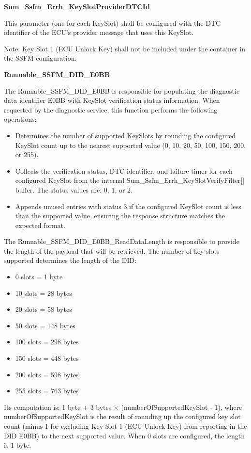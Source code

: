 \textbf{Sum\_Ssfm\_Errh\_KeySlotProviderDTCId}

This parameter (one for each KeySlot) shall be configured with the DTC identifier of the ECU's provider message that uses this KeySlot.

Note: Key Slot 1 (ECU Unlock Key) shall not be included under the  container in the SSFM configuration.

\textbf{Runnable\_SSFM\_DID\_E0BB}

The Runnable\_SSFM\_DID\_E0BB is responsible for populating the diagnostic data identifier E0BB with KeySlot verification status information. When requested by the diagnostic service, this function performs the following operations:

\begin{itemize}
	\item Determines the number of supported KeySlots by rounding the configured KeySlot count up to the nearest supported value (0, 10, 20, 50, 100, 150, 200, or 255).
	\item Collects the verification status, DTC identifier, and failure timer for each configured KeySlot from the internal Sum\_Ssfm\_Errh\_KeySlotVerifyFilter[] buffer. The status values are: 0, 1, or 2.
	\item Appends unused entries with status 3 if the configured KeySlot count is less than the supported value, ensuring the response structure matches the expected format.
\end{itemize}

The Runnable\_SSFM\_DID\_E0BB\_ReadDataLength is responsible to provide the length of the payload that will be retrieved. 
The number of key slots supported determines the length of the DID:
\begin{itemize}
	\item 0 slots = 1 byte
	\item 10 slots = 28 bytes
	\item 20 slots = 58 bytes
	\item 50 slots = 148 bytes
	\item 100 slots = 298 bytes
	\item 150 slots = 448 bytes
	\item 200 slots = 598 bytes
	\item 255 slots = 763 bytes
\end{itemize}
Its computation is: 1 byte + 3 bytes $\times$ (numberOfSupportedKeySlot - 1), where numberOfSupportedKeySlot is the result of rounding up the configured key slot count (minus 1 for excluding Key Slot 1 (ECU Unlock Key) from reporting in the DID E0BB) to the next supported value. When 0 slots are configured, the length is 1 byte.

